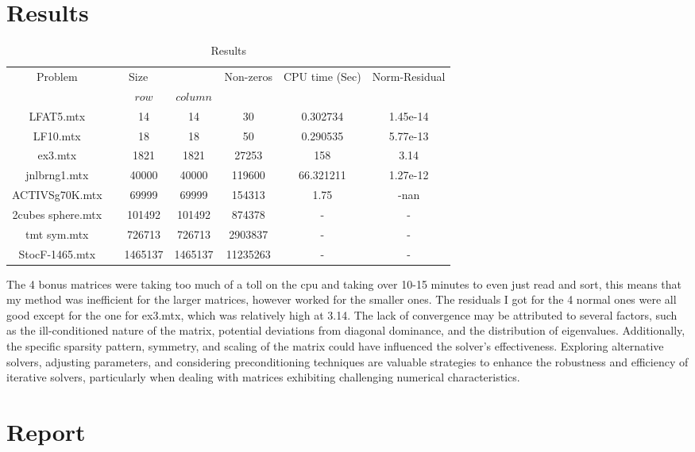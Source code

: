 \documentclass[12pt]{article}
\begin{document}
	\section{Results}
	\begin{table}[h!]
		\caption{Results }
		\label{table:1}
		\centering
		\begin{tabular}{c c c c c c c}
			\hline
			Problem & \multicolumn{2}{c}{Size} & &Non-zeros & CPU time (Sec) & Norm-Residual\\
			& & $row$ & $column$ & \\
			\hline
			LFAT5.mtx   &   & 14 &14  &30  &0.302734 &1.45e-14\\
			LF10.mtx &   &18  &18 &50 &0.290535& 5.77e-13\\
			ex3.mtx & &1821  &1821  &27253 &158& 3.14\\
			jnlbrng1.mtx  &  &40000  &40000  &119600 &66.321211 &1.27e-12\\
			ACTIVSg70K.mtx  &  &69999   &69999   &154313 &1.75& -nan\\
			2cubes sphere.mtx &  &101492   &101492   &874378 &-&-\\
			tmt sym.mtx& &726713  &726713   &2903837 &-&-\\
			StocF-1465.mtx & &1465137  &1465137   &11235263 &-&-\\
			\hline
		\end{tabular}
	\end{table}
 The 4 bonus matrices were taking too much of a toll on the cpu and taking over 10-15 minutes to even just read and sort, this means that my method was inefficient for the larger matrices, however worked for the smaller ones. The residuals I got for the 4 normal ones were all good except for the one for ex3.mtx, which was relatively high at 3.14. The lack of convergence may be attributed to several factors, such as the ill-conditioned nature of the matrix, potential deviations from diagonal dominance, and the distribution of eigenvalues. Additionally, the specific sparsity pattern, symmetry, and scaling of the matrix could have influenced the solver's effectiveness. Exploring alternative solvers, adjusting parameters, and considering preconditioning techniques are valuable strategies to enhance the robustness and efficiency of iterative solvers, particularly when dealing with matrices exhibiting challenging numerical characteristics.


\section{Report }
\end{document}
